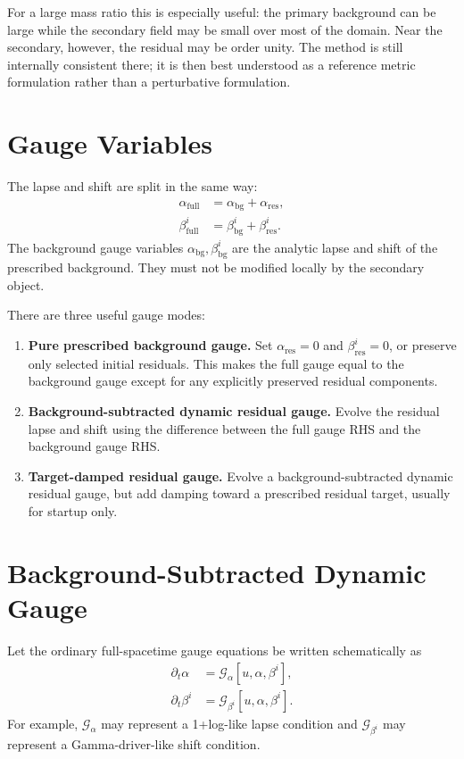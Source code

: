 \documentclass[11pt]{article}
\newcommand{\abg}{\alpha_{\mathrm{bg}}}
\newcommand{\ares}{\alpha_{\mathrm{res}}}
\newcommand{\afull}{\alpha_{\mathrm{full}}}
\newcommand{\bbg}{\beta^i_{\mathrm{bg}}}
\newcommand{\bres}{\beta^i_{\mathrm{res}}}
\newcommand{\bfull}{\beta^i_{\mathrm{full}}}
\newcommand{\gaugea}{\mathcal{G}_{\alpha}}
\newcommand{\gaugeb}{\mathcal{G}_{\beta^i}}
\begin{document}
For a large mass ratio this is especially useful: the primary background can
be large while the secondary field may be small over most of the domain.
Near the secondary, however, the residual may be order unity.  The method is
still internally consistent there; it is then best understood as a reference
metric formulation rather than a perturbative formulation.

\section{Gauge Variables}

The lapse and shift are split in the same way:
\begin{align}
  \afull &= \abg + \ares, \\
  \bfull &= \bbg + \bres.
\end{align}
The background gauge variables \(\abg,\bbg\) are the analytic lapse and shift
of the prescribed background.  They must not be modified locally by the
secondary object.

There are three useful gauge modes:
\begin{enumerate}[label=\arabic*.]
  \item \textbf{Pure prescribed background gauge.}
  Set \(\ares=0\) and \(\bres=0\), or preserve only selected initial residuals.
  This makes the full gauge equal to the background gauge except for any
  explicitly preserved residual components.

  \item \textbf{Background-subtracted dynamic residual gauge.}
  Evolve the residual lapse and shift using the difference between the full
  gauge RHS and the background gauge RHS.

  \item \textbf{Target-damped residual gauge.}
  Evolve a background-subtracted dynamic residual gauge, but add damping
  toward a prescribed residual target, usually for startup only.
\end{enumerate}

\section{Background-Subtracted Dynamic Gauge}

Let the ordinary full-spacetime gauge equations be written schematically as
\begin{align}
  \partial_t \alpha &= \gaugea[u,\alpha,\beta^i], \\
  \partial_t \beta^i &= \gaugeb[u,\alpha,\beta^i].
\end{align}
For example, \(\gaugea\) may represent a 1+log-like lapse condition and
\(\gaugeb\) may represent a Gamma-driver-like shift condition.
\end{document}

